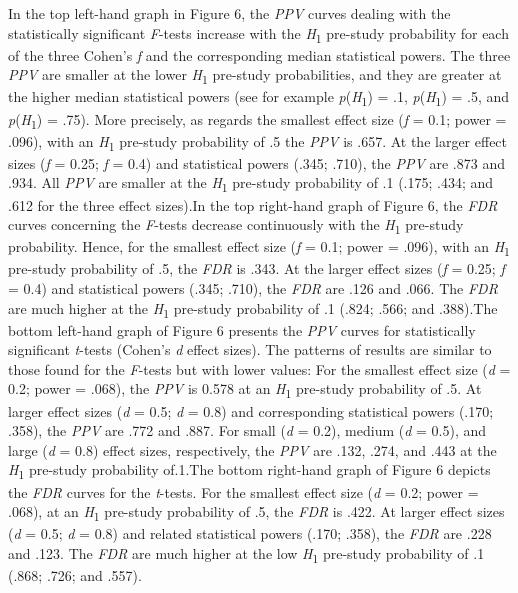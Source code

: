 \documentclass[authordate, meta]{jote-new-article}
\begin{document}
	In the top left-hand graph in Figure 6, the \emph{PPV} curves dealing with the statistically significant \emph{F}-tests increase with the \emph{H}\textsubscript{1} pre-study probability for each of the three Cohen's \emph{f} and the corresponding median statistical powers. The three \emph{PPV} are smaller at the lower \emph{H}\textsubscript{1} pre-study probabilities, and they are greater at the higher median statistical powers (see for example \emph{p}(\emph{H}\textsubscript{1}) = .1, \emph{p}(\emph{H}\textsubscript{1}) = .5, and \emph{p}(\emph{H}\textsubscript{1}) = .75). More precisely, as regards the smallest effect size (\emph{f} = 0.1; power = .096), with an \emph{H}\textsubscript{1} pre-study probability of .5 the \emph{PPV} is .657. At the larger effect sizes (\emph{f} = 0.25; \emph{f} = 0.4) and statistical powers (.345; .710), the \emph{PPV} are .873 and .934. All \emph{PPV} are smaller at the \emph{H}\textsubscript{1} pre-study probability of .1 (.175; .434; and .612 for the three effect sizes).In the top right-hand graph of Figure 6, the \emph{FDR} curves concerning the \emph{F}-tests decrease continuously with the \emph{H}\textsubscript{1} pre-study probability. Hence, for the smallest effect size (\emph{f} = 0.1; power = .096), with an \emph{H}\textsubscript{1} pre-study probability of .5, the \emph{FDR} is .343. At the larger effect sizes (\emph{f} = 0.25; \emph{f} = 0.4) and statistical powers (.345; .710), the \emph{FDR} are .126 and .066. The \emph{FDR} are much higher at the \emph{H}\textsubscript{1} pre-study probability of .1 (.824; .566; and .388).The bottom left-hand graph of Figure 6 presents the \emph{PPV} curves for statistically significant \emph{t}-tests (Cohen's \emph{d} effect sizes). The patterns of results are similar to those found for the \emph{F}-tests but with lower values: For the smallest effect size (\emph{d} = 0.2; power = .068), the \emph{PPV} is 0.578 at an \emph{H}\textsubscript{1} pre-study probability of .5. At larger effect sizes (\emph{d} = 0.5; \emph{d} = 0.8) and corresponding statistical powers (.170; .358), the \emph{PPV} are .772 and .887. For small (\emph{d} = 0.2), medium (\emph{d }= 0.5), and large (\emph{d} = 0.8) effect sizes, respectively, the \emph{PPV} are .132, .274, and .443 at the \emph{H}\textsubscript{1} pre-study probability of.1.The bottom right-hand graph of Figure 6 depicts the \emph{FDR} curves for the \emph{t}-tests. For the smallest effect size (\emph{d} = 0.2; power = .068), at an \emph{H}\textsubscript{1} pre-study probability of .5, the \emph{FDR} is .422. At larger effect sizes (\emph{d} = 0.5; \emph{d} = 0.8) and related statistical powers (.170; .358), the \emph{FDR} are .228 and .123. The \emph{FDR} are much higher at the low \emph{H}\textsubscript{1} pre-study probability of .1 (.868; .726; and .557).
\end{document}
